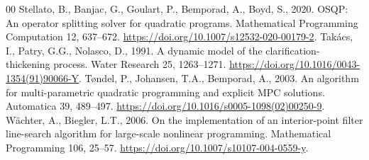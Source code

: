\documentclass[a4paper,fleqn]{cas-sc}
\begin{document}
\begin{thebibliography}{00}
Stellato, B., Banjac, G., Goulart, P., Bemporad, A., Boyd, S., 2020. OSQP: An operator splitting solver for quadratic programs. Mathematical Programming Computation 12, 637--672. \url{https://doi.org/10.1007/s12532-020-00179-2}.
Tak\'acs, I., Patry, G.G., Nolasco, D., 1991. A dynamic model of the clarification-thickening process. Water Research 25, 1263--1271. \url{https://doi.org/10.1016/0043-1354(91)90066-Y}.
T{\o}ndel, P., Johansen, T.A., Bemporad, A., 2003. An algorithm for multi-parametric quadratic programming and explicit MPC solutions. Automatica 39, 489--497. \url{https://doi.org/10.1016/s0005-1098(02)00250-9}.
W\"achter, A., Biegler, L.T., 2006. On the implementation of an interior-point filter line-search algorithm for large-scale nonlinear programming. Mathematical Programming 106, 25--57. \url{https://doi.org/10.1007/s10107-004-0559-y}.
\end{thebibliography}
\end{document}
